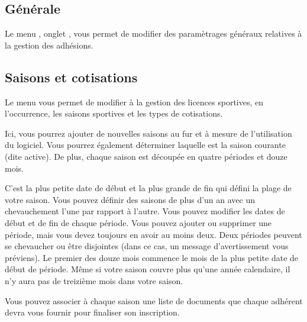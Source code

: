 \documentclass[a4paper,10pt,oneside,french]{sphinxmanual}
\begin{document}
\subsection{Générale}
\label{\detokenize{member/config:generale}}
Le menu , onglet , vous permet de modifier des paramètrages généraux relatives à la gestion des adhésions.
\begin{quote}

\noindent{}
\end{quote}


\subsection{Saisons et cotisations}
\label{\detokenize{member/config:saisons-et-cotisations}}
Le menu  vous permet de modifier à la gestion des licences sportives, en l’occurrence, les saisons sportives et les types de cotisations.

\begin{quote}

\noindent{}
\end{quote}

Ici, vous pourrez ajouter de nouvelles saisons au fur et à mesure de l’utilisation du logiciel. Vous pourrez également déterminer laquelle est la saison courante (dite active).
De plus, chaque saison est découpée en quatre périodes et douze mois.

C’est la plus petite date de début et la plus grande de fin qui défini la plage de votre saison. Vous pouvez définir des saisons de plus d’un an avec un chevauchement l’une par rapport à l’autre.
Vous pouvez modifier les dates de début et de fin de chaque période. Vous pouvez ajouter ou supprimer une période, mais vous devez toujours en avoir au moins deux.
Deux périodes peuvent se chevaucher ou être disjointes (dans ce cas, un message d’avertissement vous préviens).
Le premier des douze mois commence le mois de la plus petite date de début de période. Même si votre saison couvre plus qu’une année calendaire, il n’y aura pas de treizième mois dans votre saison.

Vous pouvez associer à chaque saison une liste de documents que chaque adhérent devra vous fournir pour finaliser son inscription.
\begin{quote}

\noindent{}
\end{quote}
\end{document}
